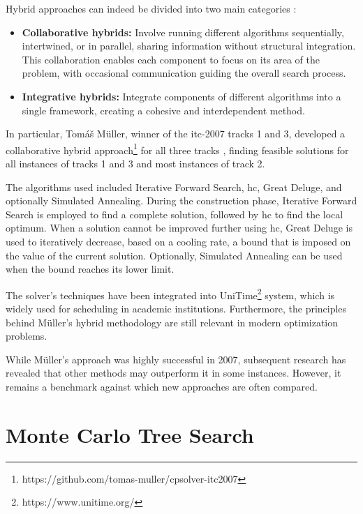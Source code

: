 Hybrid approaches can indeed be divided into two main categories \cite{abdipoor_meta-heuristic_2023}:

\begin{itemize}
\item \textbf{Collaborative hybrids:} Involve running different algorithms sequentially, intertwined, or in parallel, sharing information without structural integration. This collaboration enables each component to focus on its area of the problem, with occasional communication guiding the overall search process.

\item \textbf{Integrative hybrids:} Integrate components of different algorithms into a single framework, creating a cohesive and interdependent method.

\end{itemize}


In particular, Tomáš Müller, winner of the \ac{itc-2007} tracks 1 and 3, developed a collaborative hybrid approach\footnote{https://github.com/tomas-muller/cpsolver-itc2007} for all three tracks \cite{muller_itc2007}, finding feasible solutions for all instances of tracks 1 and 3 and most instances of track 2. 

The algorithms used included Iterative Forward Search, \ac{hc}, Great Deluge, and optionally Simulated Annealing. During the construction phase, Iterative Forward Search is employed to find a complete solution, followed by \ac{hc} to find the local optimum. When a solution cannot be improved further using \ac{hc}, Great Deluge is used to iteratively decrease, based on a cooling rate, a bound that is imposed on the value of the current solution. Optionally, Simulated Annealing can be used when the bound reaches its lower limit.

The solver's techniques have been integrated into UniTime\footnote{https://www.unitime.org/} system, which is widely used for scheduling in academic institutions. Furthermore, the principles behind Müller's hybrid methodology are still relevant in modern optimization problems.

While Müller's approach was highly successful in 2007, subsequent research has revealed that other methods may outperform it in some instances. However, it remains a benchmark against which new approaches are often compared.

\section{Monte Carlo Tree Search}

